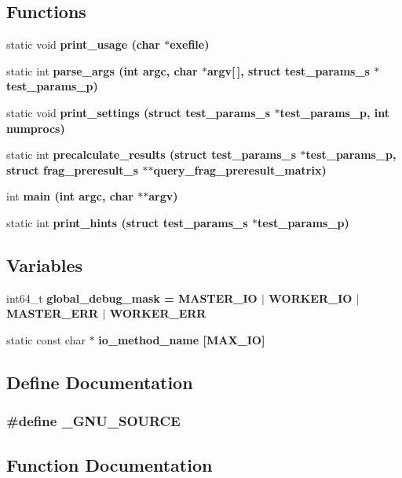 \subsection*{Functions}
\begin{CompactItemize}
\item 
static void \bf{print\_\-usage} (char $\ast$exefile)
\item 
static int \bf{parse\_\-args} (int argc, char $\ast$argv[$\,$], struct \bf{test\_\-params\_\-s} $\ast$test\_\-params\_\-p)
\item 
static void \bf{print\_\-settings} (struct \bf{test\_\-params\_\-s} $\ast$test\_\-params\_\-p, int numprocs)
\item 
static int \bf{precalculate\_\-results} (struct \bf{test\_\-params\_\-s} $\ast$test\_\-params\_\-p, struct \bf{frag\_\-preresult\_\-s} $\ast$$\ast$query\_\-frag\_\-preresult\_\-matrix)
\item 
int \bf{main} (int argc, char $\ast$$\ast$argv)
\item 
static int \bf{print\_\-hints} (struct \bf{test\_\-params\_\-s} $\ast$test\_\-params\_\-p)
\end{CompactItemize}
\subsection*{Variables}
\begin{CompactItemize}
\item 
int64\_\-t \bf{global\_\-debug\_\-mask} = MASTER\_\-IO $|$ WORKER\_\-IO $|$ MASTER\_\-ERR $|$ WORKER\_\-ERR
\item 
static const char $\ast$ \bf{io\_\-method\_\-name} [MAX\_\-IO]
\end{CompactItemize}


\subsection{Define Documentation}
\subsubsection{\setlength{\rightskip}{0pt plus 5cm}\#define \_\-GNU\_\-SOURCE}\label{s3asim_8c_369266c24eacffb87046522897a570d5}




\subsection{Function Documentation}
